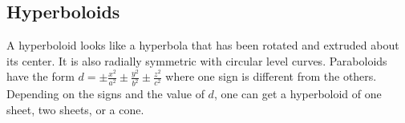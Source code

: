 \subsection{Hyperboloids}
\noindent
A hyperboloid looks like a hyperbola that has been rotated and extruded about its center. It is also radially symmetric with circular level curves. Paraboloids have the form $d=\pm\frac{x^2}{a^2}\pm\frac{y^2}{b^2}\pm\frac{z^2}{c^2}$ where one sign is different from the others. Depending on the signs and the value of $d$, one can get a hyperboloid of one sheet, two sheets, or a cone.


